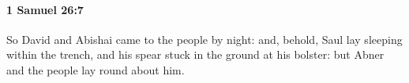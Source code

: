 
		\paragraph{1 Samuel 26:7} %
			\label{1SAMUEL-26-7}

			So David and Abishai came to the people by night: and, behold, Saul lay sleeping within the trench, and his spear stuck in the ground at his bolster: but Abner and the people lay round about him.


